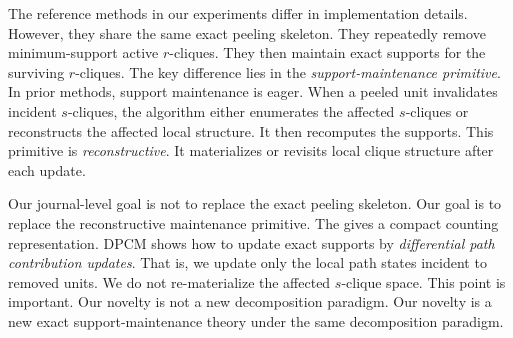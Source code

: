 {
The reference methods in our experiments differ in implementation details.
%
However, they share the same exact peeling skeleton.
%
They repeatedly remove minimum-support active $r$-cliques.
%
They then maintain exact supports for the surviving $r$-cliques.
%
The key difference lies in the \emph{support-maintenance primitive}.
%
In prior methods, support maintenance is eager.
%
When a peeled unit invalidates incident $s$-cliques, the algorithm either enumerates the affected $s$-cliques or reconstructs the affected local structure.
%
It then recomputes the supports.
%
This primitive is \emph{reconstructive}.
%
It materializes or revisits local clique structure after each update.

Our journal-level goal is not to replace the exact peeling skeleton.
%
Our goal is to replace the reconstructive maintenance primitive.
%
The \cpi gives a compact counting representation.
%
DPCM shows how to update exact supports by \emph{differential path contribution updates}.
%
That is, we update only the local path states incident to removed units.
%
We do not re-materialize the affected $s$-clique space.
%
This point is important.
%
Our novelty is not a new decomposition paradigm.
%
Our novelty is a new exact support-maintenance theory under the same decomposition paradigm.
}
